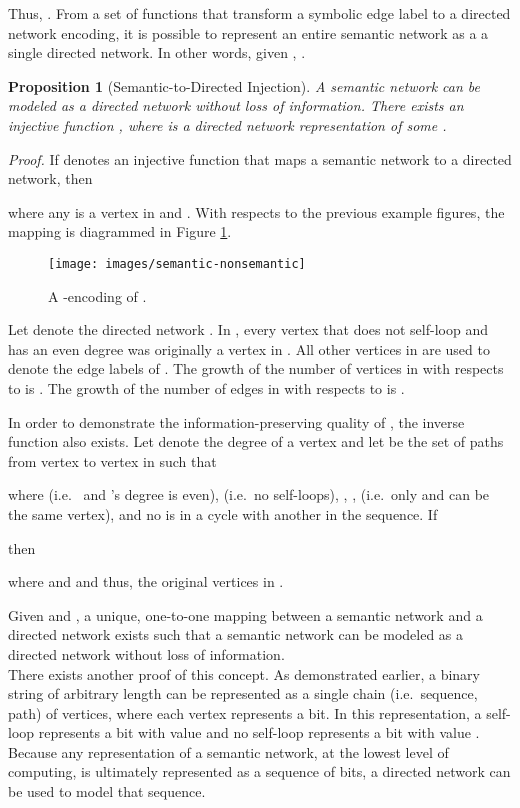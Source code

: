 \documentclass[twocolumn,preprintnumbers,amsmath,amssymb,letter]{revtex4}
\newtheorem{proposition}{Proposition}
\newcommand{\qed}{\hfill  \hfill \\}
\begin{document}
Thus, . From a set of functions that transform a symbolic edge label to a directed network encoding, it is possible to represent an entire semantic network as a a single directed network. In other words, given , .

\begin{proposition}[Semantic-to-Directed Injection]
A semantic network can be modeled as a directed network without loss of information. There exists an injective function , where  is a directed network representation of some .
\end{proposition}
\emph{Proof.} If  denotes an injective function that maps a semantic network to a directed network, then

where any  is a vertex in  and . With respects to the previous example figures, the  mapping is diagrammed in Figure \ref{fig:semantic-nonsemantic}.
\begin{figure}[h!]
	\centering
	\texttt{[image: images/semantic-nonsemantic]}
	 \caption{\label{fig:semantic-nonsemantic}A -encoding of .}
\end{figure}

Let  denote the directed network . In , every vertex that does not self-loop and has an even degree was originally a vertex in . All other vertices in  are used to denote the edge labels of . The growth of the number of vertices in  with respects to  is . The growth of the number of edges in  with respects to  is .

In order to demonstrate the information-preserving quality of , the inverse function  also exists. Let  denote the degree of a vertex and let  be the set of paths from vertex  to vertex  in  such that

where  (i.e.~ and 's degree is even),  (i.e.~no self-loops), , ,  (i.e.~only  and  can be the same vertex), and no  is in a cycle with another  in the sequence. If

then

where  and  and thus, the original vertices in .

Given  and , a unique, one-to-one mapping between a semantic network and a directed network exists such that a semantic network can be modeled as a directed network without loss of information. \qed

There exists another proof of this concept. As demonstrated earlier, a binary string of arbitrary length can be represented as a single chain (i.e.~sequence, path) of vertices, where each vertex represents a bit. In this representation, a self-loop represents a bit with value  and no self-loop represents a bit with value . Because any representation of a semantic network, at the lowest level of computing, is ultimately represented as a sequence of bits, a directed network can  be used to model that sequence.
\end{document}
